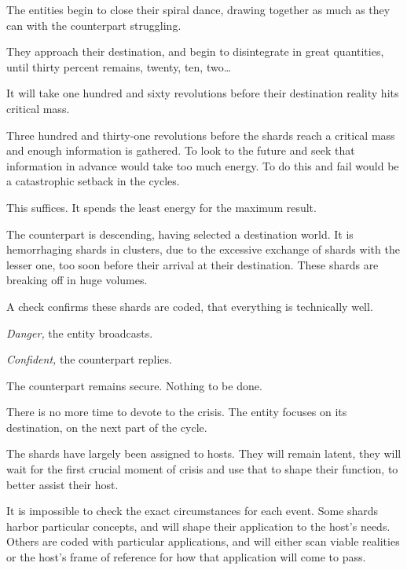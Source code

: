 The entities begin to close their spiral dance, drawing together as much as they can with the counterpart struggling.



They approach their destination, and begin to disintegrate in great quantities, until thirty percent remains, twenty, ten, two\ldots



It will take one hundred and sixty revolutions before their destination reality hits critical mass.



Three hundred and thirty-one revolutions before the shards reach a critical mass and enough information is gathered.  To look to the future and seek that information in advance would take too much energy.  To do this and fail would be a catastrophic setback in the cycles.



This suffices.  It spends the least energy for the maximum result.



The counterpart is descending, having selected a destination world.  It is hemorrhaging shards in clusters, due to the excessive exchange of shards with the lesser one, too soon before their arrival at their destination.  These shards are breaking off in huge volumes.



A check confirms these shards are coded, that everything is technically well.



\emph{Danger, }the entity broadcasts.



\emph{Confident, }the counterpart replies.



The counterpart remains secure.  Nothing to be done.



There is no more time to devote to the crisis.  The entity focuses on its destination, on the next part of the cycle.



The shards have largely been assigned to hosts.  They will remain latent, they will wait for the first crucial moment of crisis and use that to shape their function, to better assist their host.



It is impossible to check the exact circumstances for each event.  Some shards harbor particular concepts, and will shape their application to the host's needs.  Others are coded with particular applications, and will either scan viable realities or the host's frame of reference for how that application will come to pass.



